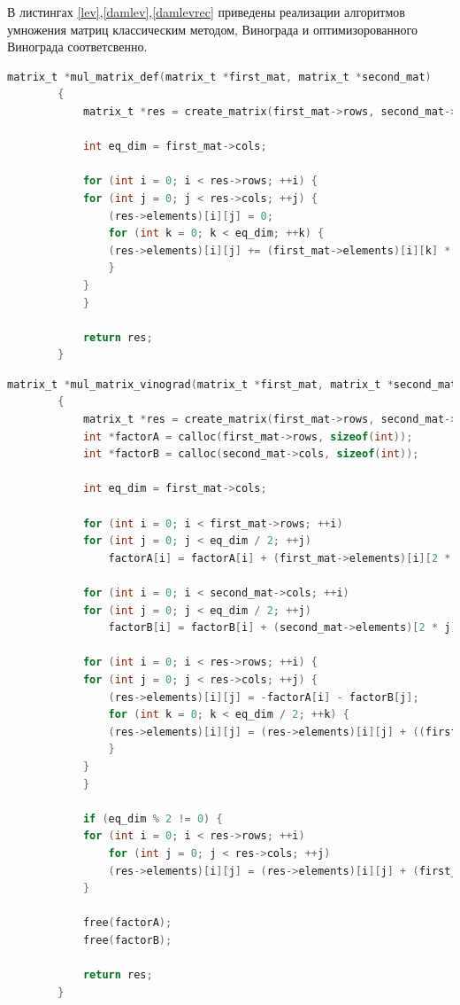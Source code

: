 \documentclass[12pt]{report}
\begin{document}
	В листингах \ref{lev},\ref{damlev},\ref{damlevrec} приведены реализации алгоритмов умножения матриц классическим методом, Винограда и оптимизорованного Винограда соответсвенно.
	
	\begin{lstlisting}[label=lev,caption=Листинг алгоритма классического умножения матриц,language=C]
		matrix_t *mul_matrix_def(matrix_t *first_mat, matrix_t *second_mat)
		{
		    matrix_t *res = create_matrix(first_mat->rows, second_mat->cols);

		    int eq_dim = first_mat->cols;

		    for (int i = 0; i < res->rows; ++i) {
			for (int j = 0; j < res->cols; ++j) {
			    (res->elements)[i][j] = 0;
			    for (int k = 0; k < eq_dim; ++k) {
				(res->elements)[i][j] += (first_mat->elements)[i][k] * (second_mat->elements)[k][j];
			    }
			}
		    }

		    return res;
		}
	\end{lstlisting}

	
	\begin{lstlisting}[label=damlev,caption=Листинг алгоритма Винограда умножения матриц,language=C]
		matrix_t *mul_matrix_vinograd(matrix_t *first_mat, matrix_t *second_mat)
		{
		    matrix_t *res = create_matrix(first_mat->rows, second_mat->cols);
		    int *factorA = calloc(first_mat->rows, sizeof(int));
		    int *factorB = calloc(second_mat->cols, sizeof(int));

		    int eq_dim = first_mat->cols;

		    for (int i = 0; i < first_mat->rows; ++i)
			for (int j = 0; j < eq_dim / 2; ++j)
			    factorA[i] = factorA[i] + (first_mat->elements)[i][2 * j] * (first_mat->elements)[i][2 * j + 1];

		    for (int i = 0; i < second_mat->cols; ++i)
			for (int j = 0; j < eq_dim / 2; ++j)
			    factorB[i] = factorB[i] + (second_mat->elements)[2 * j][i] * (second_mat->elements)[2 * j + 1][i];

		    for (int i = 0; i < res->rows; ++i) {
			for (int j = 0; j < res->cols; ++j) {
			    (res->elements)[i][j] = -factorA[i] - factorB[j];
			    for (int k = 0; k < eq_dim / 2; ++k) {
				(res->elements)[i][j] = (res->elements)[i][j] + ((first_mat->elements)[i][2 * k] + (second_mat->elements)[2 * k + 1][j]) * ((first_mat->elements)[i][2 * k + 1] + (second_mat->elements)[2 * k][j]);
			    }
			}
		    }

		    if (eq_dim % 2 != 0) {
			for (int i = 0; i < res->rows; ++i)
			    for (int j = 0; j < res->cols; ++j)
				(res->elements)[i][j] = (res->elements)[i][j] + (first_mat->elements)[i][first_mat->cols - 1] * (second_mat->elements)[second_mat->rows - 1][j];
		    }

		    free(factorA);
		    free(factorB);

		    return res;
		}
	\end{lstlisting}
	
\end{document}
